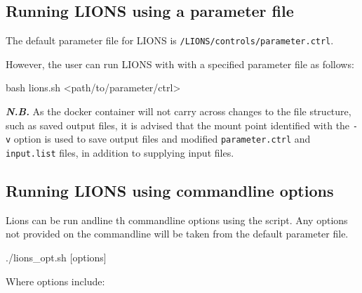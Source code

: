 \documentclass[11pt]{scrartcl}
\begin{document}
\subsection{Running LIONS using a parameter file}

The default parameter file for LIONS is \texttt{/LIONS/controls/parameter.ctrl}. 

However, the user can run LIONS with with a specified parameter file as follows:
\begin{bash}
bash lions.sh <path/to/parameter/ctrl>
\end{bash}

\textit{\textbf{N.B.}} As the docker container will not carry across changes to the file structure, such as saved output files, it is advised that the mount point identified with the \texttt{-v} option is used to save output files and modified \texttt{parameter.ctrl} and \texttt{input.list} files, in addition to supplying input files.

\newpage
\subsection{Running LIONS using commandline options}

Lions can be run andline th commandline options using the  script. Any options not provided on the commandline will be taken from the default parameter file.
\begin{bash}
./lions_opt.sh [options]
\end{bash}

Where options include:
\end{document}
